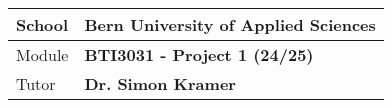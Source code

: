 \maketitle

\begin{table}[H]
    \centering
    \begin{tabularx}{\textwidth}{l X}
        \toprule
        School           & \textbf{Bern University of Applied Sciences} \\
        \midrule
        Module           & \textbf{BTI3031 - Project 1 (24/25)} \\
        \midrule
        Tutor            & \textbf{Dr. Simon Kramer} \\
        \bottomrule
    \end{tabularx}
    \label{tab:title-page}
\end{table}

\pagebreak